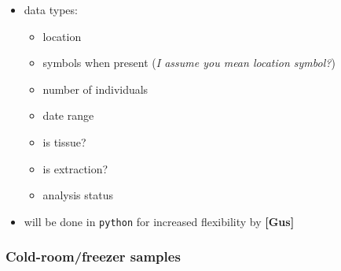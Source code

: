 \documentclass[letterpaper]{scrartcl}
\begin{document}
\begin{itemize}
\itemsep1pt\parskip0pt
\item
  data types:

  \begin{itemize}
  \itemsep1pt\parskip0pt
  \item
    location
  \item
    symbols when present (\emph{I assume you mean location symbol?})
  \item
    number of individuals
  \item
    date range
  \item
    is tissue?
  \item
    is extraction?
  \item
    analysis status
  \end{itemize}
\item
  will be done in \texttt{python} for increased flexibility by
  \textbf{{[}Gus{]}}
\end{itemize}

\subsubsection{Cold-room/freezer
samples}\label{cold-roomfreezer-samples}
\end{document}
